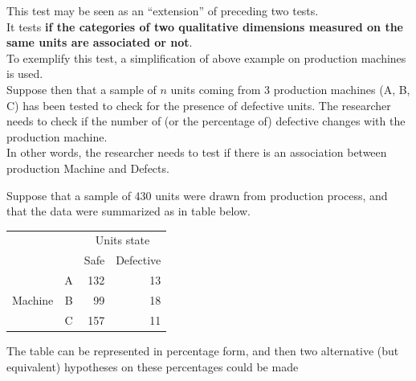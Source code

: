 \begin{frame}
  \vspace*{.25cm}
  This test may be seen as an ``extension'' of preceding two tests.\\
  \vspace*{.25cm}
  It tests \textbf{if the categories of two qualitative dimensions measured on the same units are associated or not}.\\
  \vspace*{.25cm}
  To exemplify this test, a simplification of above example on production machines is used.\\
  \vspace*{.25cm}
  Suppose then that a sample of $n$ units coming from 3 production machines (A, B, C) has been tested to check for the presence of defective units. The researcher needs to check if the number of (or the percentage of) defective changes with the production machine.\\
  \vspace*{.25cm}
  In other words, the researcher needs to test if there is an association between production Machine and Defects.
\end{frame}

\begin{frame}
  \vspace*{.5cm}
  Suppose that a sample of 430 units were drawn from production process, and that the data were summarized as in table below.\\
  \begin{table}
    \begin{tabular}{|c|c|r|r|}
      \cline{3-4}
      \multicolumn{2}{c}{} & \multicolumn{2}{|c|}{Units state}\\ \cline{3-4}
      \multicolumn{2}{c}{} & \multicolumn{1}{|c|}{\hspace*{.25cm}Safe\hspace*{.25cm}} & \multicolumn{1}{|c|}{Defective}\\ \hline
      & \multicolumn{1}{|c|}{\hspace*{.5cm}A\hspace*{.5cm}} & \multicolumn{1}{|r|}{132} & \multicolumn{1}{|r|}{13}\\ \cline{2-4}
      \multicolumn{1}{|c|}{Machine} & \multicolumn{1}{|c|}{B} & \multicolumn{1}{|r|}{99} & \multicolumn{1}{|r|}{18}\\ \cline{2-4}
      & \multicolumn{1}{|c|}{C} & \multicolumn{1}{|r|}{157} & \multicolumn{1}{|r|}{11}\\ \hline
    \end{tabular}
  \end{table} 
  \vspace*{.5cm}
  The table can be represented in percentage form, and then two alternative (but equivalent) hypotheses on these percentages could be made
\end{frame}

